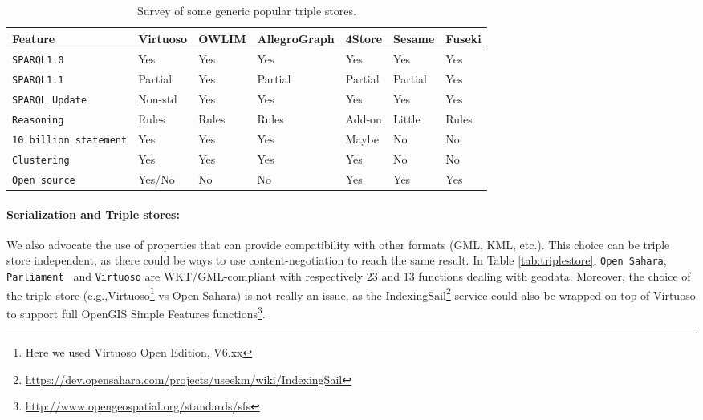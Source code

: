 \begin{table}[htb!]
    \caption{Survey of some generic popular triple stores.} \label{tab:generictriples}
    \small
    \centering
   
     \begin{tabular}{*{7}{l}}
    \toprule
    \textbf{Feature} & \textbf{Virtuoso} & \textbf{OWLIM} & \textbf{AllegroGraph} & \textbf{4Store} &  \textbf{Sesame} & \textbf{Fuseki} \\
    \toprule
    
    \texttt{SPARQL1.0} & Yes & Yes & Yes & Yes & Yes & Yes \\
    \midrule
    
    \texttt{SPARQL1.1} & Partial & Yes & Partial & Partial & Partial & Yes \\
    \midrule
    
   \texttt{SPARQL Update} & Non-std & Yes & Yes & Yes & Yes & Yes \\
    \midrule
    
   \texttt{Reasoning} & Rules & Rules & Rules & Add-on & Little & Rules \\
    \midrule
    
    \texttt{10 billion statement} & Yes & Yes & Yes & Maybe & No & No \\
    \midrule
    
      \texttt{Clustering} & Yes & Yes & Yes & Yes & No & No \\
    \midrule
    
      \texttt{Open source} & Yes/No & No & No & Yes & Yes & Yes \\
    
    
    \bottomrule
     
     
     \end{tabular}
    
    \end{table}
  
  
    \paragraph{Serialization and Triple stores:} We also advocate the use of properties that can provide compatibility with other formats (GML, KML, etc.). This choice can be triple store independent, as there could be ways to use content-negotiation to reach the same result. In Table \ref{tab:triplestore}, \texttt{Open Sahara}, \texttt{Parliament } and  \texttt{Virtuoso} are WKT/GML-compliant with respectively $23$ and $13$ functions dealing with geodata. Moreover, the choice of the triple store (e.g.,Virtuoso\footnote{Here we used Virtuoso Open Edition, V6.xx} vs Open Sahara) is not really an issue, as the IndexingSail\footnote{\url{https://dev.opensahara.com/projects/useekm/wiki/IndexingSail}} service could also be wrapped on-top of Virtuoso to support full OpenGIS Simple Features functions\footnote{\url{http://www.opengeospatial.org/standards/sfs}}.
    

